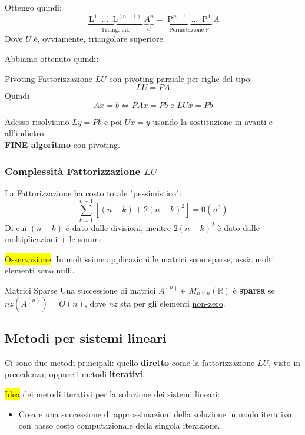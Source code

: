 \documentclass{article}
\begin{document}
Ottengo quindi:\[\underbrace{\operatorname{L}^1\ \dots\ \operatorname{L}^{(n-1)}}_{\text{Triang. inf.}}\underbrace{A^n}_U=\underbrace{\operatorname{P}^{n-1}\ \dots\ \operatorname{P}^1}_{\text{Permutazione }\mathbb P}A\]
Dove $U$ è, ovviamente, triangolare superiore.

Abbiamo ottenuto quindi:
\begin{defi}{Pivoting}{}
    Fattorizzazione $LU$ con \underline{pivoting} parziale per righe del tipo:
    \[\boxed{LU=PA}\]
    Quindi
    \[Ax=b\Leftrightarrow PAx=Pb \text{ e }LUx=Pb\]
\end{defi}

Adesso risolviamo $Ly=Pb$ e poi $Ux=y$ usando la sostituzione in avanti e all'indietro.\\
\textbf{FINE algoritmo} con pivoting.

\subsubsection{Complessità Fattorizzazione $LU$}
La Fattorizzazione ha costo totale "pessimistico":\[\sum_{k=1}^{n-1}\left[(n-k)+2(n-k)^2\right]=\boxed{0(n^3)}\]
Di cui $(n-k)$ è dato dalle divisioni, mentre $2(n-k)^2$ è dato dalle moltiplicazioni $+$ le somme.

\colorbox{yellow}{Osservazione}: In moltissime applicazioni le matrici sono \underline{sparse}, ossia molti elementi sono nulli.
\begin{note}{Matrici Sparse}{}
    Una successione di matrici $A^{(n)}\in M_{n\times n}(\mathbb R)$ è \textbf{sparsa} se $nz\left(A^{(n)}\right)=O(n)$, dove $nz$ sta per gli elementi \underline{non-zero}.
\end{note}

\subsection{Metodi per sistemi lineari}
Ci sono due metodi principali: quello \textbf{diretto} come la fattorizzazione $LU$, visto in precedenza; oppure i metodi \textbf{iterativi}.

\colorbox{yellow}{Idea} dei metodi iterativi per la soluzione dei sistemi lineari:
\begin{itemize}
    \item[] Creare una successione di approssimazioni della soluzione in modo iterativo con basso costo computazionale della singola iterazione.
\end{itemize}
\end{document}
